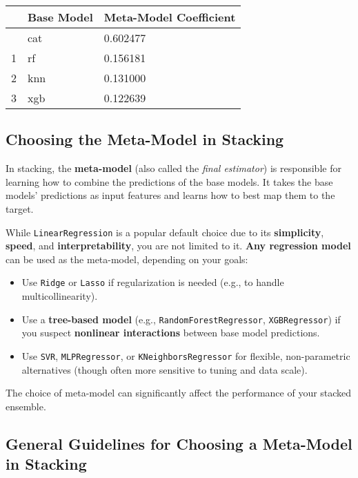 \documentclass[
  letterpaper,
  DIV=11,
  numbers=noendperiod]{scrreprt}
\providecommand{\tightlist}{%
  \setlength{\itemsep}{0pt}\setlength{\parskip}{0pt}}\usepackage{longtable,booktabs,array}
\begin{document}
\begin{longtable}[]{@{}lll@{}}
\toprule\noalign{}
& Base Model & Meta-Model Coefficient \\
\midrule\noalign{}
\endhead
\bottomrule\noalign{}
\endlastfoot
0 & cat & 0.602477 \\
1 & rf & 0.156181 \\
2 & knn & 0.131000 \\
3 & xgb & 0.122639 \\
\end{longtable}

\subsection{Choosing the Meta-Model in
Stacking}\label{choosing-the-meta-model-in-stacking}

In stacking, the \textbf{meta-model} (also called the \emph{final
estimator}) is responsible for learning how to combine the predictions
of the base models. It takes the base models' predictions as input
features and learns how to best map them to the target.

While \texttt{LinearRegression} is a popular default choice due to its
\textbf{simplicity}, \textbf{speed}, and \textbf{interpretability}, you
are not limited to it. \textbf{Any regression model} can be used as the
meta-model, depending on your goals:

\begin{itemize}
\tightlist
\item
  Use \texttt{Ridge} or \texttt{Lasso} if regularization is needed
  (e.g., to handle multicollinearity).
\item
  Use a \textbf{tree-based model} (e.g., \texttt{RandomForestRegressor},
  \texttt{XGBRegressor}) if you suspect \textbf{nonlinear interactions}
  between base model predictions.
\item
  Use \texttt{SVR}, \texttt{MLPRegressor}, or
  \texttt{KNeighborsRegressor} for flexible, non-parametric alternatives
  (though often more sensitive to tuning and data scale).
\end{itemize}

The choice of meta-model can significantly affect the performance of
your stacked ensemble.

\subsection{General Guidelines for Choosing a Meta-Model in
Stacking}\label{general-guidelines-for-choosing-a-meta-model-in-stacking}
\end{document}
